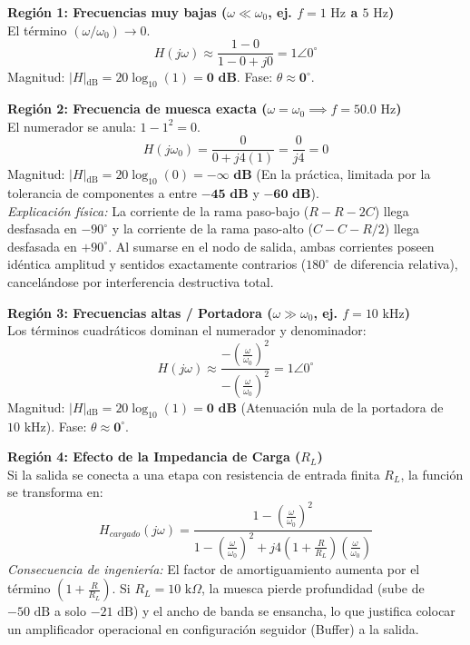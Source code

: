 \documentclass[11pt,a4paper,twoside]{article}
\begin{document}
\textbf{Región 1: Frecuencias muy bajas ($\omega \ll \omega_0$, ej. $f = 1\text{ Hz}$ a $5\text{ Hz}$)}\\
El término $(\omega/\omega_0) \to 0$.
\begin{equation*}
    H(j\omega) \approx \frac{1 - 0}{1 - 0 + j0} = 1 \angle 0^\circ
\end{equation*}
Magnitud: $\vert{}H\vert{}_{\text{dB}} = 20 \log_{10}(1) = \mathbf{0\text{ dB}}$. Fase: $\theta \approx \mathbf{0^\circ}$.

\vspace{0.3cm}
\textbf{Región 2: Frecuencia de muesca exacta ($\omega = \omega_0 \implies f = 50.0\text{ Hz}$)}\\
El numerador se anula: $1 - 1^2 = 0$.
\begin{equation*}
    H(j\omega_0) = \frac{0}{0 + j4(1)} = \frac{0}{j4} = 0
\end{equation*}
Magnitud: $\vert{}H\vert{}_{\text{dB}} = 20 \log_{10}(0) = \mathbf{-\infty\text{ dB}}$ (En la práctica, limitada por la tolerancia de componentes a entre $\mathbf{-45\text{ dB}}$ y $\mathbf{-60\text{ dB}}$).\\
\textit{Explicación física:} La corriente de la rama paso-bajo ($R-R-2C$) llega desfasada en $-90^\circ$ y la corriente de la rama paso-alto ($C-C-R/2$) llega desfasada en $+90^\circ$. Al sumarse en el nodo de salida, ambas corrientes poseen idéntica amplitud y sentidos exactamente contrarios ($180^\circ$ de diferencia relativa), cancelándose por interferencia destructiva total.

\vspace{0.3cm}
\textbf{Región 3: Frecuencias altas / Portadora ($\omega \gg \omega_0$, ej. $f = 10\text{ kHz}$)}\\
Los términos cuadráticos dominan el numerador y denominador:
\begin{equation*}
    H(j\omega) \approx \frac{-\left(\frac{\omega}{\omega_0}\right)^2}{-\left(\frac{\omega}{\omega_0}\right)^2} = 1 \angle 0^\circ
\end{equation*}
Magnitud: $\vert{}H\vert{}_{\text{dB}} = 20 \log_{10}(1) = \mathbf{0\text{ dB}}$ (Atenuación nula de la portadora de $10\text{ kHz}$). Fase: $\theta \approx \mathbf{0^\circ}$.

\vspace{0.3cm}
\textbf{Región 4: Efecto de la Impedancia de Carga ($R_L$)}\\
Si la salida se conecta a una etapa con resistencia de entrada finita $R_L$, la función se transforma en:
\begin{equation}
    H_{cargado}(j\omega) = \frac{1 - \left(\frac{\omega}{\omega_0}\right)^2}{1 - \left(\frac{\omega}{\omega_0}\right)^2 + j 4 \left(1 + \frac{R}{R_L}\right) \left(\frac{\omega}{\omega_0}\right)}
\end{equation}
\textit{Consecuencia de ingeniería:} El factor de amortiguamiento aumenta por el término $\left(1 + \frac{R}{R_L}\right)$. Si $R_L = 10\text{ k}\Omega$, la muesca pierde profundidad (sube de $-50\text{ dB}$ a solo $-21\text{ dB}$) y el ancho de banda se ensancha, lo que justifica colocar un amplificador operacional en configuración seguidor (Buffer) a la salida.
\end{document}
